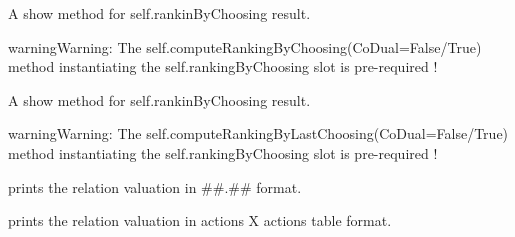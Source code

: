 \documentclass[letterpaper,10pt,english]{sphinxmanual}
\begin{document}
\begin{fulllineitems}

\begin{fulllineitems}
\label{techDoc:digraphs.Digraph.showRankingByChoosing}
A show method for self.rankinByChoosing result.

\begin{notice}{warning}{Warning:}
The self.computeRankingByChoosing(CoDual=False/True) method instantiating the self.rankingByChoosing slot is pre-required !
\end{notice}

\end{fulllineitems}


\begin{fulllineitems}
\label{techDoc:digraphs.Digraph.showRankingByLastChoosing}
A show method for self.rankinByChoosing result.

\begin{notice}{warning}{Warning:}
The self.computeRankingByLastChoosing(CoDual=False/True) method instantiating the self.rankingByChoosing slot is pre-required !
\end{notice}

\end{fulllineitems}


\begin{fulllineitems}
\label{techDoc:digraphs.Digraph.showRelation}
prints the relation valuation in \#\#.\#\# format.

\end{fulllineitems}


\begin{fulllineitems}
\label{techDoc:digraphs.Digraph.showRelationTable}
prints the relation valuation in actions X actions table format.


\end{fulllineitems}
\end{fulllineitems}
\end{document}
